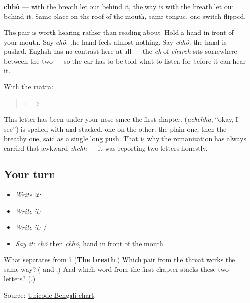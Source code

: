 \begin{quote}
\end{quote}

\textbf{chhô} — \textbf{} with the breath let out behind it, the way \textbf{} is \textbf{} with the breath let out behind it. Same place on the roof of the mouth, same tongue, one switch flipped.

The pair is worth hearing rather than reading about. Hold a hand in front of your mouth. Say \emph{chô}: the hand feels almost nothing. Say \emph{chhô}: the hand is pushed. English has no contrast here at all — the \emph{ch} of \emph{church} sits somewhere between the two — so the ear has to be told what to listen for before it can hear it.

With the mātrā:

\begin{quote}
\textbf{} + \textbf{} $\to$ \textbf{}
\end{quote}

This letter has been under your nose since the first chapter. \textbf{} (\emph{āchchhā}, \textquotedblleft{}okay, I see\textquotedblright{}) is spelled with \textbf{} and \textbf{} stacked, one on the other: the plain one, then the breathy one, said as a single long push. That is why the romanization has always carried that awkward \emph{chchh} — it was reporting two letters honestly.

\subsection*{Your turn}
\begin{itemize}
\raggedright
  \item \emph{Write it:} 
  \item \emph{Write it:}  
  \item \emph{Write it:}   /  
  \item \emph{Say it:} \emph{chô} then \emph{chhô}, hand in front of the mouth
\end{itemize}

\begin{tcolorbox}[breakable,colback=teal!4,colframe=teal!35!black,title={Before you move on}]
What separates \textbf{} from \textbf{}? (\textbf{The breath}.) Which pair from the throat works the same way? (\textbf{} and \textbf{}.) And which word from the first chapter stacks these two letters? (\textbf{}.)

Source: \href{https://www.unicode.org/charts/PDF/U0980.pdf}{Unicode Bengali chart}.
\end{tcolorbox}

